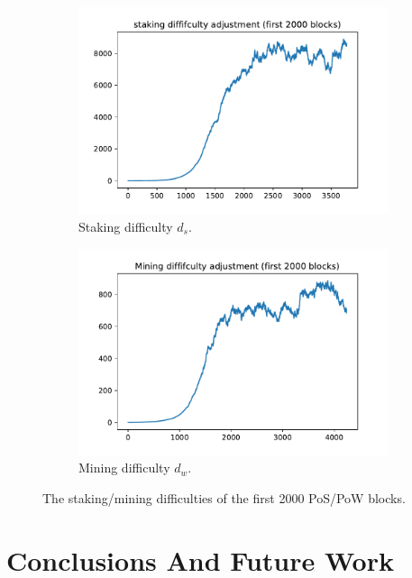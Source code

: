 \documentclass[a4paper]{article}
\begin{document}
\begin{figure}
    \centering
    \begin{subfigure}[b]{0.45\textwidth}
        \includegraphics[width=\textwidth]{assets/pos-diff-head.pdf}
        \caption{Staking difficulty $d_s$.}
    \end{subfigure}
    \begin{subfigure}[b]{0.45\textwidth}
        \includegraphics[width=\textwidth]{assets/pow-diff-head.pdf}
        \caption{Mining difficulty $d_w$.}
    \end{subfigure}
    \caption{The staking/mining difficulties of the first 2000 PoS/PoW blocks.}
    \label{fig:diff-adj}
\end{figure}

\section{Conclusions And Future Work}
\end{document}
